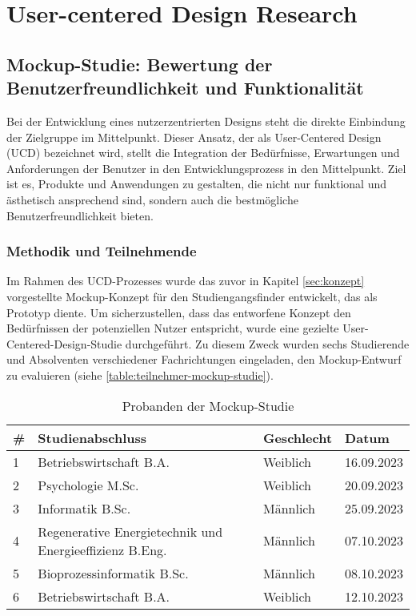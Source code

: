 \section{User-centered Design Research}

\subsection{Mockup-Studie: Bewertung der Benutzerfreundlichkeit und
Funktionalität}
Bei der Entwicklung eines nutzerzentrierten Designs steht die direkte Einbindung
der Zielgruppe im Mittelpunkt. Dieser Ansatz, der als User-Centered Design (UCD) 
bezeichnet wird, stellt die Integration der Bedürfnisse, Erwartungen und
Anforderungen der Benutzer in den Entwicklungsprozess in den Mittelpunkt. Ziel
ist es, Produkte und Anwendungen zu gestalten, die nicht nur funktional und
ästhetisch ansprechend sind, sondern auch die bestmögliche
Benutzerfreundlichkeit bieten.

\subsubsection{Methodik und Teilnehmende}
Im Rahmen des UCD-Prozesses wurde das zuvor in Kapitel \ref{sec:konzept}
vorgestellte Mockup-Konzept für den Studiengangsfinder entwickelt, das als
Prototyp diente. Um sicherzustellen, dass das entworfene Konzept den
Bedürfnissen der potenziellen Nutzer entspricht, wurde eine gezielte 
User-Centered-Design-Studie durchgeführt. Zu diesem Zweck wurden sechs
Studierende und Absolventen verschiedener Fachrichtungen eingeladen, den
Mockup-Entwurf zu evaluieren (siehe \autoref{table:teilnehmer-mockup-studie}).

\begin{table}[!ht]
    \centering
    \begin{tabular}{|l|l|l|l|}
        \hline
        \textbf{\#} & \textbf{Studienabschluss}                               & \textbf{Geschlecht} & \textbf{Datum} \\ \hline
        1           & Betriebswirtschaft B.A.                                 & Weiblich            & 16.09.2023     \\ \hline
        2           & Psychologie M.Sc.                                       & Weiblich            & 20.09.2023     \\ \hline
        3           & Informatik B.Sc.                                        & Männlich            & 25.09.2023     \\ \hline
        4           & Regenerative Energietechnik und Energieeffizienz B.Eng. & Männlich            & 07.10.2023     \\ \hline
        5           & Bioprozessinformatik B.Sc.                              & Männlich            & 08.10.2023     \\ \hline
        6           & Betriebswirtschaft B.A.                                 & Weiblich            & 12.10.2023     \\ \hline
    \end{tabular}

    \caption{Probanden der Mockup-Studie}
    \label{table:teilnehmer-mockup-studie}
\end{table}

